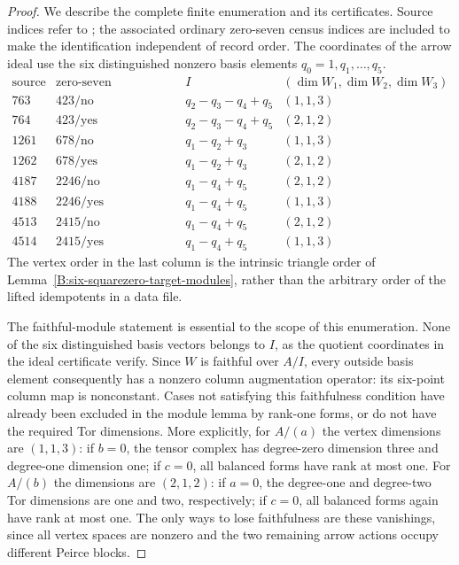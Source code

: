 \begin{proof}
We describe the complete finite enumeration and its certificates.
Source indices refer to
; the associated
ordinary zero-seven census indices are included to make the
identification independent of record order.  The coordinates of
the arrow ideal use the six distinguished nonzero basis elements
$q_0=1,q_1,\ldots,q_5$.
\[
\begin{array}{c|c|c|c}
\text{source}&\text{zero-seven class/opposite}&I&
 (\dim W_1,\dim W_2,\dim W_3)\\\hline
763&423/\text{no}&q_2-q_3-q_4+q_5&(1,1,3)\\
764&423/\text{yes}&q_2-q_3-q_4+q_5&(2,1,2)\\
1261&678/\text{no}&q_1-q_2+q_3&(1,1,3)\\
1262&678/\text{yes}&q_1-q_2+q_3&(2,1,2)\\
4187&2246/\text{no}&q_1-q_4+q_5&(2,1,2)\\
4188&2246/\text{yes}&q_1-q_4+q_5&(1,1,3)\\
4513&2415/\text{no}&q_1-q_4+q_5&(2,1,2)\\
4514&2415/\text{yes}&q_1-q_4+q_5&(1,1,3)
\end{array}
\]
The vertex order in the last column is the intrinsic triangle
order of Lemma~\ref{B:six-squarezero-target-modules}, rather than
the arbitrary order of the lifted idempotents in a data file.

The faithful-module statement is essential to the scope of this
enumeration.  None of the six distinguished basis vectors belongs
to $I$, as the quotient coordinates in the ideal certificate
verify.  Since $W$ is faithful over $A/I$, every outside basis
element consequently has a nonzero column augmentation operator:
its six-point column map is nonconstant.  Cases not satisfying this
faithfulness condition have already been excluded in the module
lemma by rank-one forms, or do not have the required Tor dimensions.
More explicitly, for $A/(a)$ the vertex dimensions are $(1,1,3)$:
if $b=0$, the tensor complex has degree-zero dimension three and
degree-one dimension one; if $c=0$, all balanced forms have rank
at most one.  For $A/(b)$ the dimensions are $(2,1,2)$:
if $a=0$, the degree-one and degree-two Tor dimensions are one
and two, respectively; if $c=0$, all balanced forms again have
rank at most one.  The only ways to lose faithfulness are these
vanishings, since all vertex spaces are nonzero and the two
remaining arrow actions occupy different Peirce blocks.


\end{proof}
